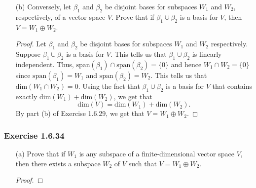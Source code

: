 \begin{enumerate}
\begin{proof}
            Since \( \beta_{1}  \) and \( \beta_{2} \) contain distinct linearly independent vectors, we must have \( \beta_{1} \cap \beta_{2} = \emptyset \). Since \( V  \) is a direct sum of the \( W_{1} \) and \( W_{2} \), we know that \( W_{1} \cap W_{2} = \{ 0 \}  \) by definition. Since \( \beta_{1}  \) and \( \beta_{2} \) generate \( W_{1} \) and \( W_{2} \) respectively, we must have \( \text{span}(\beta_{1}) \cap \text{span}(\beta_{2}) = \{ 0 \}  \). Now, we have the set \( \beta_{1} \cup \beta_{2}  \) as a linearly independent set by exercise 1.5.21. Observe that \(\text{span}(\beta_{1} \cup \beta_{2})  \subseteq V  \) follows immediately. Now, take any \( v \in V  \) that is not in \( \beta_{1} \cup \beta_{2} \) such that adjoining this vector \( v \in V  \) produces a linearly dependent set. By Theorem 1.7, we have \( v \in \text{span}(\beta_{1} \cup \beta_{2}) \). Thus, we have \( V \subseteq \text{span}(\beta_{1} \cup \beta_{2}) \). Hence, \( \beta_{1} \cup \beta_{2} \) is a generating set for \( V  \) and we are done.
        \end{proof}
    \item[(b)] Conversely, let \( \beta_{1} \) and \( \beta_{2} \) be disjoint bases for subspaces \( W_{1} \) and \( W_{2} \), respectively, of a vector space \( V  \). Prove that if \( \beta_{1} \cup \beta_{2} \) is a basis for \( V  \), then \( V = W_{1} \oplus W_{2} \).
        \begin{proof}
        Let \( \beta_{1} \) and \( \beta_{2} \) be disjoint bases for subspaces \( W_{1} \) and \( W_{2} \) respectively. Suppose \( \beta_{1} \cup \beta_{2} \) is a basis for \( V  \). This tells us that \( \beta_{1} \cup \beta_{2} \) is linearly independent. Thus, \( \text{span}(\beta_{1}) \cap \text{span}(\beta_{2}) = \{ 0 \}  \) and hence \( W_{1} \cap W_{2} = \{ 0 \}  \) since \( \text{span}(\beta_{1}) = W_{1} \) and \( \text{span}(\beta_{2}) = W_{2} \). This tells us that \( \text{dim}(W_{1} \cap W_{2}) = 0   \).  Using the fact that \( \beta_{1} \cup \beta_{2} \) is a basis for \( V  \) that contains exactly \( \text{dim}(W_{1}) + \text{dim}(W_{2}) \), we get that          
        \[ \text{dim}(V) = \text{dim}(W_{1}) + \text{dim}(W_{2}). \]
        By part (b) of Exercise 1.6.29, we get that \( V = W_{1} \oplus W_{2} \).
        \end{proof}
\end{enumerate}

\subsubsection{Exercise 1.6.34} 
\begin{enumerate}
    \item[(a)] Prove that if \( W_{1} \) is any subspace of a finite-dimensional vector space \( V  \), then there exists a subspace \( W_{2} \) of \( V  \) such that \( V = W_{1} \oplus W_{2}  \).
        \begin{proof}
        
        \end{proof}
\end{enumerate}
